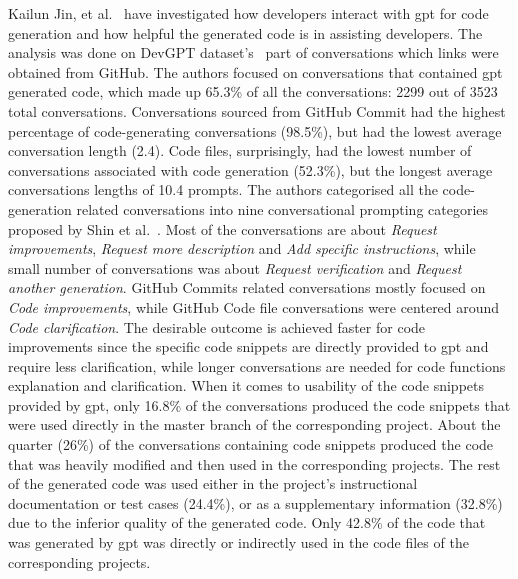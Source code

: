 Kailun Jin, et al.~\cite{devgpt-llm-for-code-gen} have investigated how developers interact with \gls{gpt} for code generation and how helpful the generated code is in assisting developers. The analysis was done on DevGPT dataset's~\cite{devgpt} part of conversations which links were obtained from GitHub. The authors focused on conversations that contained \gls{gpt} generated code, which made up 65.3\% of all the conversations: 2299 out of 3523 total conversations. Conversations sourced from GitHub Commit had the highest percentage of code-generating conversations (98.5\%), but had the lowest average conversation length (2.4). Code files, surprisingly, had the lowest number of conversations associated with code generation (52.3\%), but the longest average conversations lengths of 10.4 prompts. The authors categorised all the code-generation related conversations into nine conversational prompting categories proposed by Shin et al.~\cite{shin2023promptengineeringfinetuning}. Most of the conversations are about \textit{Request improvements}, \textit{Request more description} and \textit{Add specific instructions}, while small number of conversations was about \textit{Request verification} and \textit{Request another generation}. GitHub Commits related conversations mostly focused on \textit{Code improvements}, while GitHub Code file conversations were centered around \textit{Code clarification}. The desirable outcome is achieved faster for code improvements since the specific code snippets are directly provided to \gls{gpt} and require less clarification, while longer conversations are needed for code functions explanation and clarification. When it comes to usability of the code snippets provided by \gls{gpt}, only 16.8\% of the conversations produced the code snippets that were used directly in the master branch of the corresponding project. About the quarter (26\%) of the conversations containing code snippets produced the code that was heavily modified and then used in the corresponding projects. The rest of the generated code was used either in the project's instructional documentation or test cases (24.4\%), or as a supplementary information (32.8\%) due to the inferior quality of the generated code. Only 42.8\% of the code that was generated by \gls{gpt} was directly or indirectly used in the code files of the corresponding projects. 

